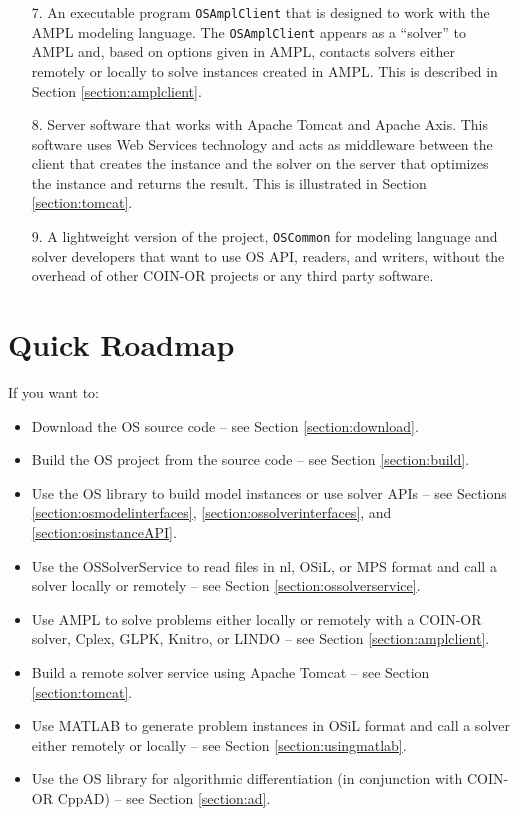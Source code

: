 \documentclass[11pt]{article}
\renewcommand{\_}{{\char"5F}}
\renewcommand{\{}{{\char"7B}}
\renewcommand{\}}{{\char"7D}}
\renewcommand{\^}{{\char"0D}}
\renewcommand{\'}{{\char"0D}}
\begin{document}
\begin{itemize}
\item[7.]  An executable program {\tt OSAmplClient} that is designed to work with the AMPL modeling language. The {\tt OSAmplClient} appears as a ``solver'' to AMPL and, based on options given in AMPL, contacts solvers either remotely or locally to solve instances created in AMPL. This is described in Section \ref{section:amplclient}.

\item[8.]  Server software that works with Apache Tomcat and Apache Axis.
This software uses Web Services technology and acts as middleware between the client that creates the instance and the  solver on the server that optimizes the instance and returns the result. This is illustrated in Section  \ref{section:tomcat}.

\item[9.]  A lightweight version of the project, {\tt OSCommon} for modeling language and solver developers that want to use OS API, readers, and writers, without the overhead of other COIN-OR projects or any third party software.
\end{itemize}


\section{Quick Roadmap}\label{section:roadmap}

If you want to:

\begin{itemize}
\item Download  the OS source code -- see Section \ref{section:download}.


\item Build the OS project from the source code -- see Section \ref{section:build}.

\item Use the OS library to build model instances or use solver APIs -- see Sections  \ref{section:osmodelinterfaces},  \ref{section:ossolverinterfaces}, and \ref{section:osinstanceAPI}.

\item Use the OSSolverService to read files in nl, OSiL, or MPS format and call a solver locally or remotely -- see Section \ref{section:ossolverservice}.


\item Use AMPL to solve problems either locally or remotely with a COIN-OR solver, Cplex, GLPK, Knitro, or LINDO -- see Section \ref{section:amplclient}.


\item Build a remote solver service using Apache Tomcat -- see Section \ref{section:tomcat}.

\item Use MATLAB to generate problem instances in OSiL format and call a solver either remotely or locally -- see Section \ref{section:usingmatlab}.

\item Use the OS library for algorithmic differentiation (in conjunction with COIN-OR CppAD) -- see Section \ref{section:ad}.
\end{itemize}
\end{document}
